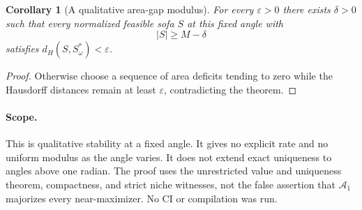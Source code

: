 \documentclass[11pt]{article}
\newtheorem{corollary}{Corollary}
\begin{document}
\begin{corollary}[A qualitative area-gap modulus]
For every $\varepsilon>0$ there exists $\delta>0$ such that every normalized feasible sofa $S$ at this fixed angle with
\[
 |S|\ge M-\delta
\]
satisfies $d_H(S,S_\omega^*)<\varepsilon$.
\end{corollary}
\begin{proof}
Otherwise choose a sequence of area deficits tending to zero while the Hausdorff distances remain at least $\varepsilon$, contradicting the theorem.
\end{proof}

\paragraph{Scope.}
This is qualitative stability at a fixed angle. It gives no explicit rate and no uniform modulus as the angle varies. It does not extend exact uniqueness to angles above one radian. The proof uses the unrestricted value and uniqueness theorem, compactness, and strict niche witnesses, not the false assertion that $\mathcal A_1$ majorizes every near-maximizer. No CI or compilation was run.
\end{document}
